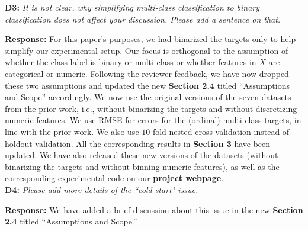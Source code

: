 \documentclass[preprint]{vldb}
\begin{document}
\noindent \textbf{D3:} \textit{It is not clear, why simplifying multi-class classification to binary classification does not affect your discussion. Please add a sentence on that.}

\vspace{2mm}
\noindent \textbf{Response:}
For this paper's purposes, we had binarized the targets only to help simplify our experimental setup. Our focus is orthogonal to the assumption of whether the class label is 
binary or multi-class or whether features in $X$ are categorical or numeric. Following the reviewer feedback, we have now dropped these two assumptions and updated the new 
\textbf{Section 2.4} titled ``Assumptions and Scope'' accordingly. We now use the original versions of the seven datasets from the prior work, i.e., without binarizing 
the targets and without discretizing numeric features. We use RMSE for errors for the (ordinal) multi-class targets, in line with the prior work. We also use $10$-fold 
nested cross-validation instead of holdout validation. All the corresponding results in \textbf{Section 3} have been updated. We have also released these new versions of 
the datasets (without binarizing the targets  and without binning numeric features), as well as the corresponding experimental code on our \textbf{project webpage}.\\

\noindent \textbf{D4:} \textit{Please add more details of the ``cold start" issue.}

\vspace{2mm}
\noindent \textbf{Response:} We have added a brief discussion about this issue in the new \textbf{Section 2.4} titled ``Assumptions and Scope.''
\end{document}
